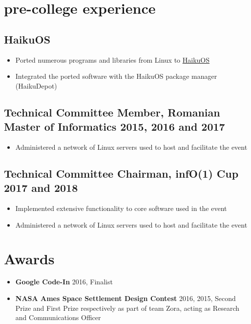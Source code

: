 \documentclass[a4paper]{article}
\begin{document}
\section*{pre-college experience}

\subsection*{HaikuOS}
\begin{itemize}
	\item Ported numerous programs and libraries from Linux to
	      \href{https://www.haiku-os.org/}{HaikuOS}
	\item Integrated the ported software with the HaikuOS package manager
	      (HaikuDepot)
\end{itemize}

\subsection*{Technical Committee Member, Romanian Master of Informatics \hfill
	2015, 2016 and 2017}
\begin{itemize}
	\item Administered a network of Linux servers used to host and facilitate
	      the event
\end{itemize}

\subsection*{Technical Committee Chairman, infO(1) Cup \hfill 2017 and 2018}
\begin{itemize}
	\item Implemented extensive functionality to core software used in the event
	\item Administered a network of Linux servers used to host and facilitate
	      the event
\end{itemize}

\section*{Awards}

\begin{itemize}
	\item \textbf{Google Code-In} 2016, Finalist
	\item \textbf{NASA Ames Space Settlement Design Contest} 2016, 2015, Second Prize and First
	      Prize respectively as part of team Zora, acting as Research and
	      Communications Officer
\end{itemize}
\end{document}
